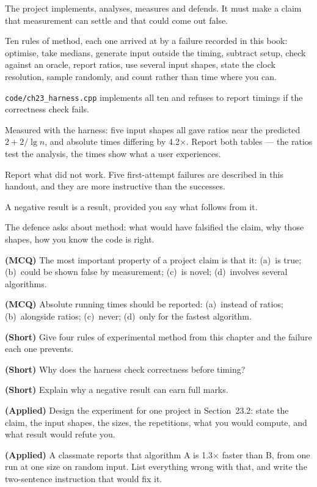 \begin{chaptersummary}
\begin{tight}
  \item The project implements, analyses, measures and defends. It must make a
        claim that measurement can settle and that could come out false.
  \item Ten rules of method, each one arrived at by a failure recorded in this
        book: optimise, take medians, generate input outside the timing,
        subtract setup, check against an oracle, report ratios, use several
        input shapes, state the clock resolution, sample randomly, and count
        rather than time where you can.
  \item \texttt{code/ch23\_harness.cpp} implements all ten and refuses to
        report timings if the correctness check fails.
  \item Measured with the harness: five input shapes all gave ratios near the
        predicted $2+2/\lg n$, and absolute times differing by 4.2$\times$.
        Report both tables --- the ratios test the analysis, the times show
        what a user experiences.
  \item Report what did not work. Five first-attempt failures are described in
        this handout, and they are more instructive than the successes.
  \item A negative result is a result, provided you say what follows from it.
  \item The defence asks about method: what would have falsified the claim, why
        those shapes, how you know the code is right.
\end{tight}
\end{chaptersummary}

\begin{reviewq}
  \item \textbf{(MCQ)} The most important property of a project claim is that
        it: (a)~is true; (b)~could be shown false by measurement;
        (c)~is novel; (d)~involves several algorithms.
  \item \textbf{(MCQ)} Absolute running times should be reported:
        (a)~instead of ratios; (b)~alongside ratios; (c)~never;
        (d)~only for the fastest algorithm.
  \item \textbf{(Short)} Give four rules of experimental method from this
        chapter and the failure each one prevents.
  \item \textbf{(Short)} Why does the harness check correctness before timing?
  \item \textbf{(Short)} Explain why a negative result can earn full marks.
  \item \textbf{(Applied)} Design the experiment for one project in
        Section~23.2: state the claim, the input shapes, the sizes, the
        repetitions, what you would compute, and what result would refute you.
  \item \textbf{(Applied)} A classmate reports that algorithm A is 1.3$\times$
        faster than B, from one run at one size on random input. List
        everything wrong with that, and write the two-sentence instruction that
        would fix it.
\end{reviewq}
